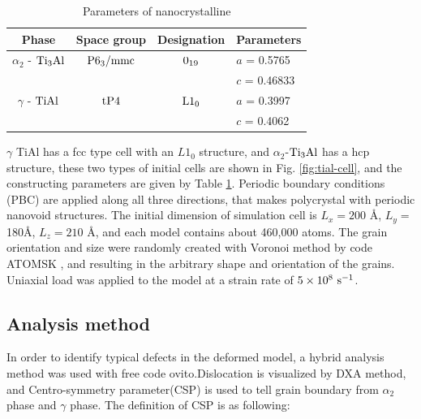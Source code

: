 \documentclass[metals,article,submit,moreauthors,pdftex,10pt,a4paper]{Definitions/mdpi}
\begin{document}
\begin{table}[ht]
	\caption{Parameters of nanocrystalline}
	\centering
	\begin{tabular}{c c c l}
	\toprule
	\textbf{Phase}			& {Space group}		& {Designation} 		& {Parameters} \\
	\midrule
	$\alpha_2$ - $\rm{Ti_3Al}$		& $\rm P6_3/mmc$ 	& $\rm 0_{19}$ 		& $a$ = 0.5765 \\
		&					&					& $c$ = 0.46833 \\
	$\gamma$ - $\rm{TiAl}$ 		& $\rm tP4$ 		& $\rm L1_0$		& $a$ = 0.3997 \\
		&					&					& $c$ = 0.4062 \\			
	\bottomrule
	\end{tabular} 
	\label{tab:lattice_parameter}
\end{table} 

$\gamma $ TiAl has a fcc type cell with an $L1_0$ structure, and $\alpha_2$-$\rm Ti_3Al$ has a hcp structure, these two types of initial cells are shown in Fig. \ref{fig:tial-cell}, and the constructing parameters are given by Table \ref{tab:lattice_parameter}. Periodic boundary conditions (PBC) are applied along all three directions, that makes polycrystal with periodic nanovoid structures. The initial dimension of simulation cell is $L_x =200$ \si{\angstrom}, $L_y = $180\si{\angstrom}, $L_z = 210$ \si{\angstrom}, and each model contains about 460,000 atoms. The grain orientation and size were randomly created with Voronoi method by code ATOMSK \cite{Hirel2015}, and resulting in the arbitrary shape and orientation of the grains. Uniaxial load was applied to the model at a strain rate of $5\times10^8\ \rm{s}^{-1}$. 
\subsection{Analysis method}
In order to identify typical defects in the deformed model, a hybrid analysis method was used with free code ovito\cite{Stukowski2010a}.Dislocation is visualized by DXA method, and Centro-symmetry parameter(CSP) is used to tell grain boundary from  $\alpha_2$ phase and $\gamma$ phase. The definition of CSP is as following:
\end{document}
